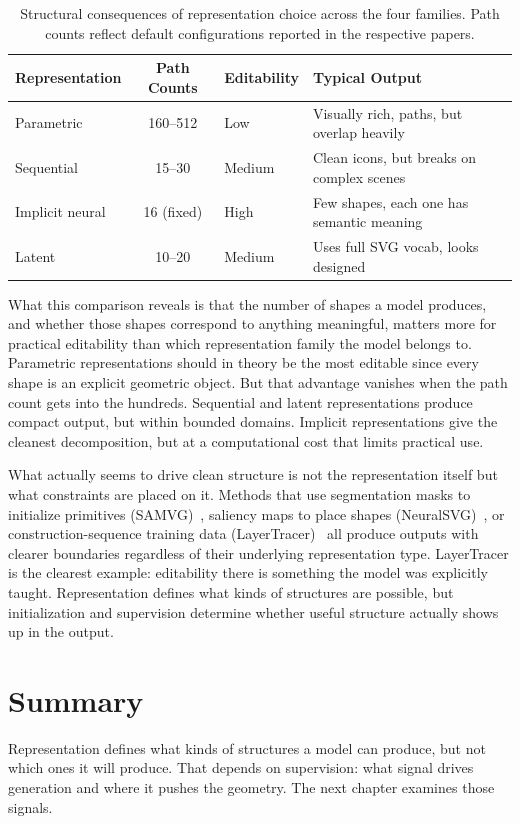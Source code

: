 \begin{table}[ht]
\centering
\caption{Structural consequences of representation choice across 
the four families. Path counts reflect default configurations 
reported in the respective papers.}
\label{tab:repr_consequences}
\begin{tabular}{l c l l}
\hline
\textbf{Representation} & \textbf{Path Counts} & 
\textbf{Editability} & \textbf{Typical Output} \\
\hline
Parametric & 160--512 & Low & Visually rich, paths, but overlap heavily \\
\hline
Sequential & 15--30 & Medium & Clean icons, but breaks on complex scenes \\
\hline
Implicit neural & 16 (fixed) & High & Few shapes, each one has semantic meaning\\
\hline
Latent & 10--20 & Medium & Uses full SVG vocab, looks designed \\
\hline
\end{tabular}
\end{table}

What this comparison reveals is that the number of shapes a model 
produces, and whether those shapes correspond to anything 
meaningful, matters more for practical editability than which 
representation family the model belongs to. Parametric 
representations should in theory be the most editable since every 
shape is an explicit geometric object. But that advantage vanishes 
when the path count gets into the hundreds. Sequential and latent 
representations produce compact output, but within bounded domains. 
Implicit representations give the cleanest decomposition, but at 
a computational cost that limits practical use.

What actually seems to drive clean structure is not the 
representation itself but what constraints are placed on it. 
Methods that use segmentation masks to initialize primitives 
(SAMVG)~\cite{zhuSAMVGMultistageImage2023}, saliency maps to place shapes (NeuralSVG)~\cite{polaczekNeuralSVGImplicitRepresentation2025}, or 
construction-sequence training data (LayerTracer)~\cite{songLayerTracerCognitiveAlignedLayered2025} all produce 
outputs with clearer boundaries regardless of their underlying 
representation type. LayerTracer is the clearest example: 
editability there is something the model was explicitly taught. 
Representation defines what kinds of structures are possible, but 
initialization and supervision determine whether useful structure 
actually shows up in the output.


\section{Summary}


Representation defines what kinds of structures a model can 
produce, but not which ones it will produce. That depends on 
supervision: what signal drives generation and where it pushes 
the geometry. The next chapter examines those signals.